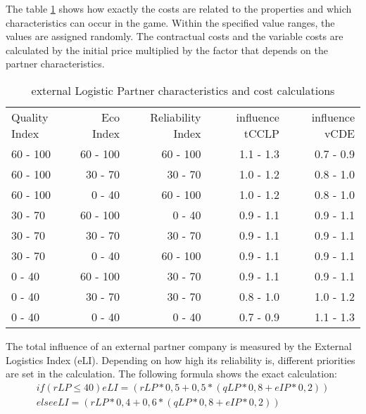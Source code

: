 The table \ref{External_logistic_partner_characteristics} shows how exactly the costs are related to the properties and which characteristics can occur in the game. Within the specified value ranges, the values are assigned randomly. 
The contractual costs and the variable costs are calculated by the initial price multiplied by the factor that depends on the partner characteristics.

\begin{table}[ht]
    \centering
    \begin{tabular}{|l|r|r|r|r|}
    \hline
    Quality Index & Eco Index & Reliability Index & influence tCCLP & influence vCDE \\
    60 - 100      & 60 - 100   & 60 - 100  & 1.1 - 1.3    & 0.7 - 0.9     \\
    60 - 100      & 30 - 70    & 30 - 70   & 1.0 - 1.2    & 0.8 - 1.0     \\
    60 - 100      & 0 - 40     & 60 - 100  & 1.0 - 1.2    & 0.8 - 1.0     \\
    30 - 70       & 60 - 100   & 0 - 40    & 0.9 - 1.1    & 0.9 - 1.1     \\
    30 - 70       & 30 - 70    & 30 - 70   & 0.9 - 1.1    & 0.9 - 1.1     \\
    30 - 70       & 0 - 40     & 60 - 100  & 0.9 - 1.1    & 0.9 - 1.1     \\
    0 - 40        & 60 - 100   & 30 - 70   & 0.9 - 1.1    & 0.9 - 1.1     \\
    0 - 40        & 30 - 70    & 30 - 70   & 0.8 - 1.0    & 1.0 - 1.2     \\
    0 - 40        & 0 - 40     & 0 - 40    & 0.7 - 0.9    & 1.1 - 1.3     \\
    \hline
    \end{tabular}
    \caption{external Logistic Partner characteristics and cost calculations}
    \label{External_logistic_partner_characteristics}
\end{table}

The total influence of an external partner company is measured by the External Logistics Index (\gls{eLI}). Depending on how high its reliability is, different priorities are set in the calculation. The following formula shows the exact calculation: 
\begin{equation}
\begin{aligned}
    if (rLP ≤ 40) eLI = { (rLP*0,5 + 0,5*(qLP*0,8 + eIP*0,2)) } \\
    else eLI = { (rLP*0,4 + 0,6*(qLP*0,8 + eIP*0,2)) }
\end{aligned}
\end{equation}

